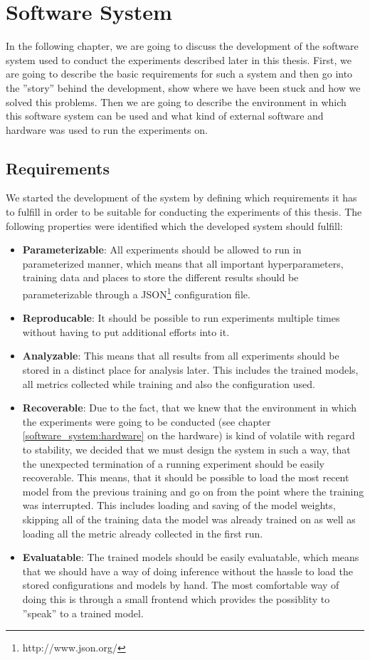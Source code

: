 \chapter{Software System}
In the following chapter, we are going to discuss the development of the software system used to conduct the experiments described later in this thesis. First, we are going to describe the basic requirements for such a system and then go into the ''story'' behind the development, show where we have been stuck and how we solved this problems. Then we are going to describe the environment in which this software system can be used and what kind of external software and hardware was used to run the experiments on.

\section{Requirements}
We started the development of the system by defining which requirements it has to fulfill in order to be suitable for conducting the experiments of this thesis. The following properties were identified which the developed system should fulfill:

\begin{itemize}
	\item \textbf{Parameterizable}: All experiments should be allowed to run in parameterized manner, which means that all important hyperparameters, training data and places to store the different results should be parameterizable through a JSON\footnote{http://www.json.org/} configuration file.
	\item \textbf{Reproducable}: It should be possible to run experiments multiple times without having to put additional efforts into it.
	\item \textbf{Analyzable}: This means that all results from all experiments should be stored in a distinct place for analysis later. This includes the trained models, all metrics collected while training and also the configuration used.
	\item \textbf{Recoverable}: Due to the fact, that we knew that the environment in which the experiments were going to be conducted (see chapter \ref{software_system:hardware} on the hardware) is kind of volatile with regard to stability, we decided that we must design the system in such a way, that the unexpected termination of a running experiment should be easily recoverable. This means, that it should be possible to load the most recent model from the previous training and go on from the point where the training was interrupted. This includes loading and saving of the model weights, skipping all of the training data the model was already trained on as well as loading all the metric already collected in the first run.
	\item \textbf{Evaluatable}: The trained models should be easily evaluatable, which means that we should have a way of doing inference without the hassle to load the stored configurations and models by hand. The most comfortable way of doing this is through a small frontend which provides the possiblity to ''speak'' to a trained model.
\end{itemize}

